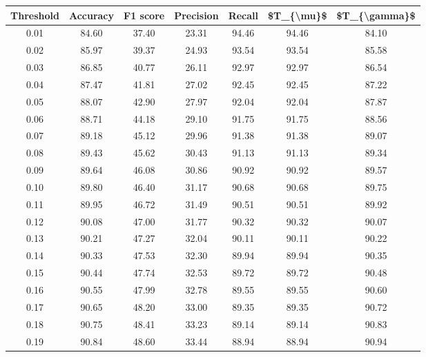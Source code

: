 \begin{tabular}{|c|c|c|c|c|c|c|}
\hline
 Threshold &  Accuracy &  F1 score &  Precision &  Recall &  \$T\_\{\textbackslash mu\}\$ &  \$T\_\{\textbackslash gamma\}\$ \\
\hline
      0.01 &     84.60 &     37.40 &      23.31 &   94.46 &      94.46 &         84.10 \\
      0.02 &     85.97 &     39.37 &      24.93 &   93.54 &      93.54 &         85.58 \\
      0.03 &     86.85 &     40.77 &      26.11 &   92.97 &      92.97 &         86.54 \\
      0.04 &     87.47 &     41.81 &      27.02 &   92.45 &      92.45 &         87.22 \\
      0.05 &     88.07 &     42.90 &      27.97 &   92.04 &      92.04 &         87.87 \\
      0.06 &     88.71 &     44.18 &      29.10 &   91.75 &      91.75 &         88.56 \\
      0.07 &     89.18 &     45.12 &      29.96 &   91.38 &      91.38 &         89.07 \\
      0.08 &     89.43 &     45.62 &      30.43 &   91.13 &      91.13 &         89.34 \\
      0.09 &     89.64 &     46.08 &      30.86 &   90.92 &      90.92 &         89.57 \\
      0.10 &     89.80 &     46.40 &      31.17 &   90.68 &      90.68 &         89.75 \\
      0.11 &     89.95 &     46.72 &      31.49 &   90.51 &      90.51 &         89.92 \\
      0.12 &     90.08 &     47.00 &      31.77 &   90.32 &      90.32 &         90.07 \\
      0.13 &     90.21 &     47.27 &      32.04 &   90.11 &      90.11 &         90.22 \\
      0.14 &     90.33 &     47.53 &      32.30 &   89.94 &      89.94 &         90.35 \\
      0.15 &     90.44 &     47.74 &      32.53 &   89.72 &      89.72 &         90.48 \\
      0.16 &     90.55 &     47.99 &      32.78 &   89.55 &      89.55 &         90.60 \\
      0.17 &     90.65 &     48.20 &      33.00 &   89.35 &      89.35 &         90.72 \\
      0.18 &     90.75 &     48.41 &      33.23 &   89.14 &      89.14 &         90.83 \\
      0.19 &     90.84 &     48.60 &      33.44 &   88.94 &      88.94 &         90.94 \\

\end{tabular}

